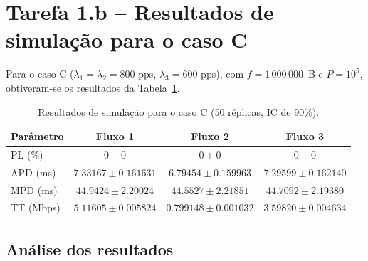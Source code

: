 \documentclass[11pt,a4paper]{article}
\begin{document}
\newpage

\section{Tarefa 1.b -- Resultados de simulação para o caso C}

Para o caso C ($\lambda_1=\lambda_2=800$ pps, $\lambda_3=600$ pps), com
$f=1\,000\,000$~B e $P=10^5$, obtiveram-se os resultados da
Tabela~\ref{tab:1b}.

\begin{table}[htbp]
    \centering
    \caption{Resultados de simulação para o caso C (50 réplicas, IC de 90\%).}
    \label{tab:1b}
    \begin{tabular}{lccc}
        \toprule
        Parâmetro & Fluxo 1 & Fluxo 2 & Fluxo 3 \\
        \midrule
        PL (\%)   & $0 \pm 0$                & $0 \pm 0$                & $0 \pm 0$ \\
        APD (ms)  & $7.33167 \pm 0.161631$   & $6.79454 \pm 0.159963$   & $7.29599 \pm 0.162140$ \\
        MPD (ms)  & $44.9424 \pm 2.20024$    & $44.5527 \pm 2.21851$    & $44.7092 \pm 2.19380$ \\
        TT (Mbps) & $5.11605 \pm 0.005824$   & $0.799148 \pm 0.001032$  & $3.59820 \pm 0.004634$ \\
        \bottomrule
    \end{tabular}
\end{table}

\subsection*{Análise dos resultados}
\end{document}
